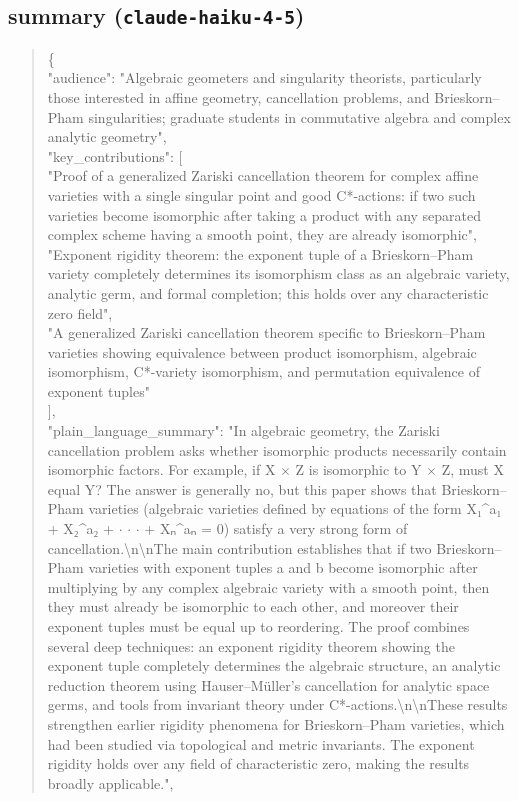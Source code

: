 \documentclass[11pt]{article}
\begin{document}
\subsection*{summary (\texttt{claude-haiku-4-5})}
\begin{quote}\small\ttfamily\raggedright
\{\\
  "audience": "Algebraic geometers and singularity theorists, particularly those interested in affine geometry, cancellation problems, and Brieskorn--Pham singularities; graduate students in commutative algebra and complex analytic geometry",\\
  "key\_contributions": [\\
    "Proof of a generalized Zariski cancellation theorem for complex affine varieties with a single singular point and good C*-actions: if two such varieties become isomorphic after taking a product with any separated complex scheme having a smooth point, they are already isomorphic",\\
    "Exponent rigidity theorem: the exponent tuple of a Brieskorn--Pham variety completely determines its isomorphism class as an algebraic variety, analytic germ, and formal completion; this holds over any characteristic zero field",\\
    "A generalized Zariski cancellation theorem specific to Brieskorn--Pham varieties showing equivalence between product isomorphism, algebraic isomorphism, C*-variety isomorphism, and permutation equivalence of exponent tuples"\\
  ],\\
  "plain\_language\_summary": "In algebraic geometry, the Zariski cancellation problem asks whether isomorphic products necessarily contain isomorphic factors. For example, if X \ensuremath{\times} Z is isomorphic to Y \ensuremath{\times} Z, must X equal Y? The answer is generally no, but this paper shows that Brieskorn--Pham varieties (algebraic varieties defined by equations of the form X₁\^{}a₁ + X₂\^{}a₂ + \ensuremath{\cdot} \ensuremath{\cdot} \ensuremath{\cdot} + Xₙ\^{}aₙ = 0) satisfy a very strong form of cancellation.\textbackslash{}n\textbackslash{}nThe main contribution establishes that if two Brieskorn--Pham varieties with exponent tuples a and b become isomorphic after multiplying by any complex algebraic variety with a smooth point, then they must already be isomorphic to each other, and moreover their exponent tuples must be equal up to reordering. The proof combines several deep techniques: an exponent rigidity theorem showing the exponent tuple completely determines the algebraic structure, an analytic reduction theorem using Hauser--Müller's cancellation for analytic space germs, and tools from invariant theory under C*-actions.\textbackslash{}n\textbackslash{}nThese results strengthen earlier rigidity phenomena for Brieskorn--Pham varieties, which had been studied via topological and metric invariants. The exponent rigidity holds over any field of characteristic zero, making the results broadly applicable.",\\

\end{quote}
\end{document}
